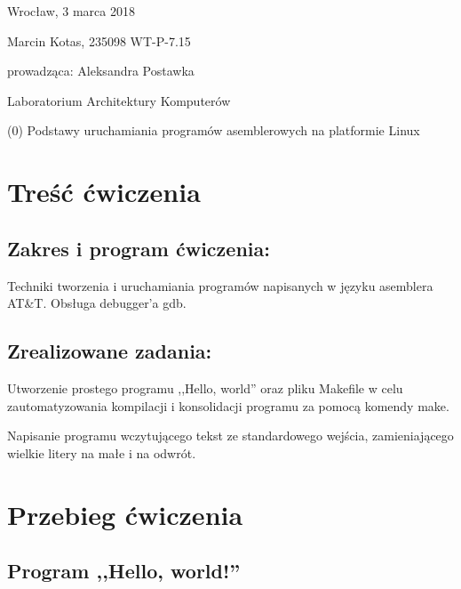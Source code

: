 \documentclass[polish, 11pt]{article}
\begin{document}
	\begin{flushright}
		Wrocław, 3 marca 2018
	\end{flushright}
	
	Marcin Kotas, 235098
	WT-P-7.15
	
	\begin{flushright}
	prowadząca: Aleksandra Postawka
	\end{flushright}
	
	\begin{center}
	Laboratorium Architektury Komputerów
	
	(0) Podstawy uruchamiania programów asemblerowych na platformie Linux
	\end{center}
	
	\section{Treść ćwiczenia}
	\subsection*{Zakres i program ćwiczenia:}
		Techniki tworzenia i uruchamiania programów napisanych w języku asemblera AT\&T. Obsługa debugger'a gdb.
		
	\subsection*{Zrealizowane zadania:}
		Utworzenie prostego programu ,,Hello, world'' oraz pliku Makefile w celu zautomatyzowania kompilacji
		i konsolidacji programu za pomocą komendy make.
		
		Napisanie programu wczytującego tekst ze standardowego wejścia,
		zamieniającego wielkie litery na małe i na odwrót.
		
	\section{Przebieg ćwiczenia}
	\subsection{Program ,,Hello, world!''}
		
\end{document}

